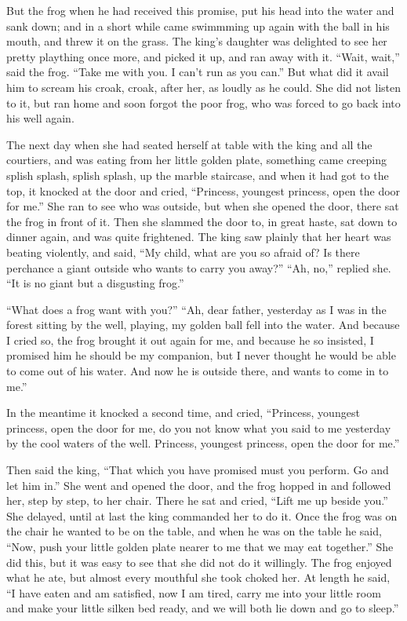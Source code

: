 \documentclass{article}
\begin{document}
But the frog when he had received this promise, put his head into the water and sank down; and in a short while came swimmming up again with the ball in his mouth, and threw it on the grass.  The king's daughter was delighted to see her pretty plaything once more, and picked it up, and ran away with it.  “Wait, wait,” said the frog.  “Take me with you.  I can't run as you can.”  But what did it avail him to scream his croak, croak, after her, as loudly as he could.  She did not listen to it, but ran home and soon forgot the poor frog, who was forced to go back into his well again.

The next day when she had seated herself at table with the king and all the courtiers, and was eating from her little golden plate, something came creeping splish splash, splish splash, up the marble staircase, and when it had got to the top, it knocked at the door and cried, “Princess, youngest princess, open the door for me.”  She ran to see who was outside, but when she opened the door, there sat the frog in front of it.  Then she slammed the door to, in great haste, sat down to dinner again, and was quite frightened.  The king saw plainly that her heart was beating violently, and said, “My child, what are you so afraid of?  Is there perchance a giant outside who wants to carry you away?”  “Ah, no,” replied she.  “It is no giant but a disgusting frog.”

“What does a frog want with you?”  “Ah, dear father, yesterday as I was in the forest sitting by the well, playing, my golden ball fell into the water.  And because I cried so, the frog brought it out again for me, and because he so insisted, I promised him he should be my companion, but I never thought he would be able to come out of his water.  And now he is outside there, and wants to come in to me.”

In the meantime it knocked a second time, and cried, “Princess, youngest princess, open the door for me,  do you not know what you said to me yesterday by the cool waters of the well.  Princess, youngest princess,  open the door for me.”

Then said the king, “That which you have promised must you perform.  Go and let him in.”  She went and opened the door, and the frog hopped in and followed her, step by step, to her chair. There he sat and cried, “Lift me up beside you.”  She delayed, until at last the king commanded her to do it.  Once the frog was on the chair he wanted to be on the table, and when he was on the table he said, “Now, push your little golden plate nearer to me that we may eat together.”  She did this, but it was easy to see that she did not do it willingly.  The frog enjoyed what he ate, but almost every mouthful she took choked her.  At length he said, “I have eaten and am satisfied, now I am tired, carry me into your little room and make your little silken bed ready, and we will both lie down and go to sleep.”
\end{document}
